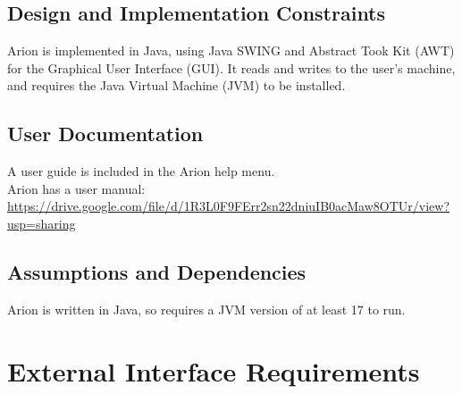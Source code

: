 \documentclass{scrreprt}
\begin{document}
\section{Design and Implementation Constraints}
Arion is implemented in Java, using Java SWING and Abstract Took Kit (AWT) for the Graphical User Interface (GUI).
It reads and writes to the user’s machine, and requires the Java Virtual Machine (JVM) to be installed.

\section{User Documentation}
\begin{flushleft}
    A user guide is included in the Arion help menu. \\
    Arion has a user manual: \\
    \url{https://drive.google.com/file/d/1R3L0F9FErr2sn22dniuIB0acMaw8OTUr/view?usp=sharing}
\end{flushleft}

\section{Assumptions and Dependencies}
Arion is written in Java, so requires a JVM version of at least 17 to run.


\chapter{External Interface Requirements}
\end{document}
